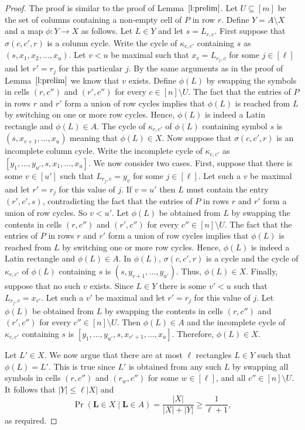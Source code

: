 \documentclass[12pt]{article}
\theoremstyle{definition}
\numberwithin{equation}{section}
\def\lref#1{Lemma~$\ref{#1}$}
\renewcommand{\geq}{\geqslant}
\renewcommand{\leq}{\leqslant}
\renewcommand{\L}{\mathbf{L}}
\begin{document}
\begin{proof}
		The proof is similar to the proof of \lref{l:prelim}. Let $U \subseteq [m]$ be the set of columns containing a non-empty cell of $P$ in row $r$. Define $Y = A \setminus X$ and a map $\phi : Y \to X$ as follows. Let $L \in Y$ and let $s = L_{r, c}$. First suppose that $\sigma(c, c', r)$ is a column cycle. Write the cycle of $\kappa_{c, c'}$ containing $s$ as $(s, x_1, x_2, \ldots, x_u)$. Let $v < u$ be maximal such that $x_v = L_{r_j, c}$ for some $j \in [\ell]$ and let $r' = r_j$ for this particular $j$. By the same arguments as in the proof of \lref{l:prelim} we know that $v$ exists. Define $\phi(L)$ by swapping the symbols in cells $(r, c'')$ and $(r', c'')$ for every $c \in [n] \setminus U$. The fact that the entries of $P$ in rows $r$ and $r'$ form a union of row cycles implies that $\phi(L)$ is reached from $L$ by switching on one or more row cycles. Hence, $\phi(L)$ is indeed a Latin rectangle and $\phi(L) \in A$. The cycle of $\kappa_{c, c'}$ of $\phi(L)$ containing symbol $s$ is $(s, x_{v+1}, \ldots, x_u)$ meaning that $\phi(L) \in X$. Now suppose that $\sigma(c, c', r)$ is an incomplete column cycle. Write the incomplete cycle of $\kappa_{c, c'}$ as $[y_1, \ldots, y_{u'}, s, x_1, \ldots, x_u]$. We now consider two cases. First, suppose that there is some $v \in [u']$ such that $L_{r_j, c} = y_v$ for some $j \in [\ell]$. Let such a $v$ be maximal and let $r' = r_j$ for this value of $j$. If $v = u'$ then $L$ must contain the entry $(r', c', s)$, contradicting the fact that the entries of $P$ in rows $r$ and $r'$ form a union of row cycles. So $v < u'$. Let $\phi(L)$ be obtained from $L$ by swapping the contents in cells $(r, c'')$ and $(r', c'')$ for every $c'' \in [n] \setminus U$. The fact that the entries of $P$ in rows $r$ and	$r'$ form a union of row cycles implies that $\phi(L)$ is reached from $L$ by switching one or more row cycles. Hence, $\phi(L)$ is indeed a Latin rectangle and $\phi(L) \in A$. In $\phi(L)$, $\sigma(c, c', r)$ is a cycle and the cycle of $\kappa_{c, c'}$ of $\phi(L)$ containing $s$ is $(s, y_{v+1}, \ldots, y_{u'})$. Thus, $\phi(L) \in X$. Finally, suppose that no such $v$ exists. Since $L \in Y$ there is some $v' < u$ such that $L_{r_j, c} = x_{v'}$. Let such a $v'$ be maximal and let $r' = r_j$ for this value of $j$. Let $\phi(L)$ be obtained from $L$ by swapping the contents in cells $(r, c'')$ and $(r', c'')$ for every $c'' \in [n] \setminus U$. Then $\phi(L) \in A$ and the incomplete cycle of $\kappa_{c, c'}$ containing $s$ is $[y_1, \ldots, y_{u'}, s, x_{v'+1}, \ldots, x_u]$. Therefore, $\phi(L) \in X$.
		
		Let $L' \in X$. We now argue that there are at most $\ell$ rectangles
		$L\in Y$ such that $\phi(L)=L'$. This is true since $L'$ is obtained
		from any such $L$ by swapping all symbols in cells $(r, c'')$ and
		$(r_w, c'')$ for some $w \in [\ell]$, and all $c'' \in [n] \setminus
		U$.  It follows that $|Y| \leq \ell|X|$ and
		\[
		\Pr\left(\L \in X\mid\L \in A\right)=\frac{|X|}{|X|+|Y|} \geq \frac1{\ell+1},
		\]
		as required.
	\end{proof}
	
\end{document}
